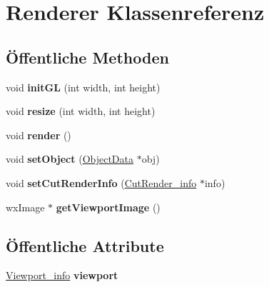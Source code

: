 \hypertarget{classRenderer}{\section{Renderer Klassenreferenz}
\label{classRenderer}
}
\subsection*{Öffentliche Methoden}
\begin{DoxyCompactItemize}
\item 
\hypertarget{classRenderer_a01887363ad27267e44c1ea0f63761a5c}{void {\bfseries init\-G\-L} (int width, int height)}\label{classRenderer_a01887363ad27267e44c1ea0f63761a5c}

\item 
\hypertarget{classRenderer_a9f4493c538688adaad4e4f0575fd3b8d}{void {\bfseries resize} (int width, int height)}\label{classRenderer_a9f4493c538688adaad4e4f0575fd3b8d}

\item 
\hypertarget{classRenderer_af7e5f8f68742f198e315fb4683a605a4}{void {\bfseries render} ()}\label{classRenderer_af7e5f8f68742f198e315fb4683a605a4}

\item 
\hypertarget{classRenderer_a9db67fbbd309875b564ca1df08daf372}{void {\bfseries set\-Object} (\hyperlink{classObjectData}{Object\-Data} $\ast$obj)}\label{classRenderer_a9db67fbbd309875b564ca1df08daf372}

\item 
\hypertarget{classRenderer_a566b30ae615b9cd74d481f360e0a567e}{void {\bfseries set\-Cut\-Render\-Info} (\hyperlink{structUtils_1_1CutRender__info}{Cut\-Render\-\_\-info} $\ast$info)}\label{classRenderer_a566b30ae615b9cd74d481f360e0a567e}

\item 
\hypertarget{classRenderer_afe4e5a9e26320e0b8276b2d0f82a1827}{wx\-Image $\ast$ {\bfseries get\-Viewport\-Image} ()}\label{classRenderer_afe4e5a9e26320e0b8276b2d0f82a1827}

\end{DoxyCompactItemize}
\subsection*{Öffentliche Attribute}
\begin{DoxyCompactItemize}
\item 
\hypertarget{classRenderer_a4428a5ef0ceaf4de5c9991a40990994d}{\hyperlink{structViewport__info}{Viewport\-\_\-info} {\bfseries viewport}}\label{classRenderer_a4428a5ef0ceaf4de5c9991a40990994d}

\end{DoxyCompactItemize}
